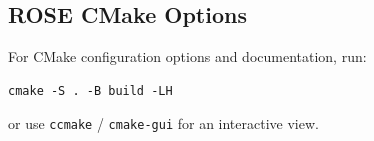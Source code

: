 \subsection{ROSE CMake Options}
\label{gettingStarted:configureOptions}

     For CMake configuration options and documentation, run:
\begin{verbatim}
cmake -S . -B build -LH
\end{verbatim}
     or use {\tt ccmake} / {\tt cmake-gui} for an interactive view.

